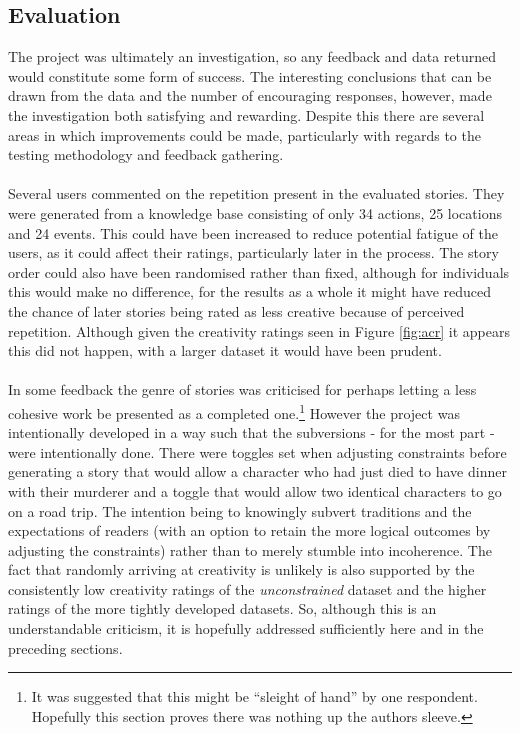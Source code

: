 \documentclass[letterpaper]{article}
\begin{document}
\subsection{Evaluation}
The project was ultimately an investigation, so any feedback and data returned would constitute some form of success. The interesting conclusions that can be drawn from the data and the number of encouraging responses, however, made the investigation both satisfying and rewarding. Despite this there are several areas in which improvements could be made, particularly with regards to the testing methodology and feedback gathering.\\
\\Several users commented on the repetition present in the evaluated stories. They were generated from a knowledge base consisting of only 34 actions, 25 locations and 24 events. This could have been increased to reduce potential fatigue of the users, as it could affect their ratings, particularly later in the process. The story order could also have been randomised rather than fixed, although for individuals this would make no difference, for the results as a whole it might have reduced the chance of later stories being rated as less creative because of perceived repetition. Although given the creativity ratings seen in Figure \ref{fig:acr} it appears this did not happen, with a larger dataset it would have been prudent.\\
\\In some feedback the genre of stories was criticised for perhaps letting a less cohesive work be presented as a completed one.\footnote{It was suggested that this might be \enquote{sleight of hand} by one respondent. Hopefully this section proves there was nothing up the authors sleeve.} However the project was intentionally developed in a way such that the subversions - for the most part - were intentionally done. There were toggles set when adjusting constraints before generating a story that would allow a character who had just died to have dinner with their murderer and a toggle that would allow two identical characters to go on a road trip. The intention being to knowingly subvert traditions and the expectations of readers (with an option to retain the more logical outcomes by adjusting the constraints) rather than to merely stumble into incoherence. The fact that randomly arriving at creativity is unlikely is also supported by the consistently low creativity ratings of the \emph{unconstrained} dataset and the higher ratings of the more tightly developed datasets. So, although this is an understandable criticism, it is hopefully addressed sufficiently here and in the preceding sections.\\
\end{document}
